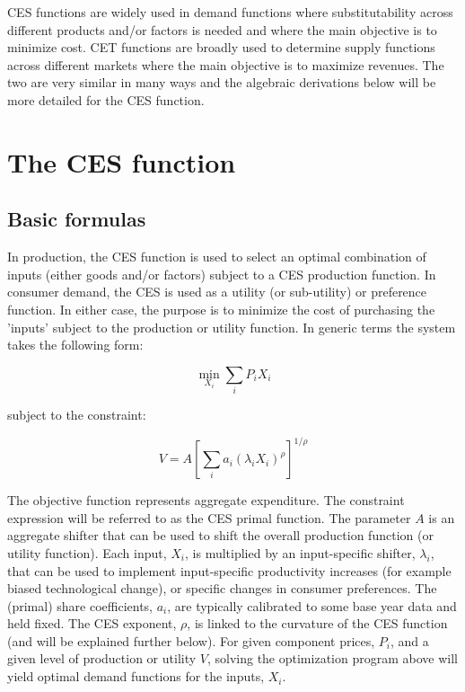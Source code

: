 CES functions are widely used in demand functions where substitutability
across different products and/or factors is needed and where the main objective
is to minimize cost. CET functions are broadly used to determine supply
functions across different markets where the main objective is to maximize
revenues. The two are very similar in many ways and the algebraic derivations
below will be more detailed for the CES function.

\section{The CES function}
\subsection{Basic formulas}

In production, the CES function is used to select an optimal combination of
inputs (either goods and/or factors) subject to a CES production function.
In consumer demand, the CES is used as a utility (or sub-utility) or preference function.
In either case, the purpose is to minimize the cost of purchasing the 'inputs'
subject to the production or utility function. In generic terms the system
takes the following form:

\begin{displaymath}
\min_{X_i}{\sum\limits_{i}{{{P}_{i}}{{X}_{i}}}}
\end{displaymath}

\noindent subject to the constraint:

\begin{displaymath}
V=A{{\left[ \sum\limits_{i}{{{a}_{i}}{{({{\lambda }_{i}}{{X}_{i}})}^{\rho }}} \right]}^{1/\rho }}
\end{displaymath}

The objective function represents aggregate expenditure. The constraint expression will be referred
to as the CES primal function. The parameter $A$ is an aggregate shifter that can be used to shift
the overall production function (or utility function). Each input, $X_i$, is multiplied by an
input-specific shifter, $\lambda_i$, that can be used to implement input-specific productivity
increases (for example biased technological change), or specific changes in consumer preferences.
The (primal) share coefficients, $a_i$, are typically calibrated to some base year data and held
fixed. The CES exponent, $\rho$, is linked to the curvature of the CES function (and will be
explained further below). For given component prices, $P_i$, and a given level of production or
utility $V$, solving the optimization program above will yield optimal demand functions for the
inputs, $X_i$.

